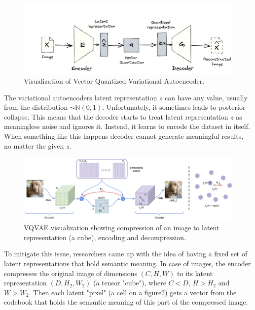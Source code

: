 % 
\begin{figure}[H]
    \centering
    \includegraphics[width=\linewidth]{concept_engineering/vqgan/vqvae.png}
    \caption{Visualization of Vector Quantized Variational Autoencoder\cite{miranda2021vqgan}.}
    \label{fig:vavae1}
\end{figure}

The variational autoencoders latent representation $z$ can have any value, usually from the distribution $\sim \mathbb{N}(0,1)$. Unfortunately, it sometimes leads to posterior collapse. This means that the decoder starts to treat latent representation $z$ as meaningless noise and ignores it. Instead, it learns to encode the dataset in itself. When something like this happens decoder cannot generate meaningful results, no matter the given $z$. 

\begin{figure}[H]
    \centering
    \includegraphics[width=\linewidth]{concept_engineering/vqvae.png}
    \caption{VQVAE visualization showing compression of an image to latent representation (a cube), encoding and decompression\cite{oord2018neuraldiscreterepresentationlearning}.}
    \label{fig:vqvae-paper}
\end{figure}

To mitigate this issue, researchers\cite{oord2018neuraldiscreterepresentationlearning} came up with the idea of having a fixed set of latent representations that hold semantic meaning. In case of images, the encoder compresses the original image of dimensions $(C,H,W)$ to its latent representation $(D,H_2,W_2)$ (a tensor "cube"), where $C<D$, $H>H_2$ and $W>W_2$. Then each latent "pixel" (a cell on a figure\ref{fig:vqvae-paper}) gets a vector from the codebook that holds the semantic meaning of this part of the compressed image. 


